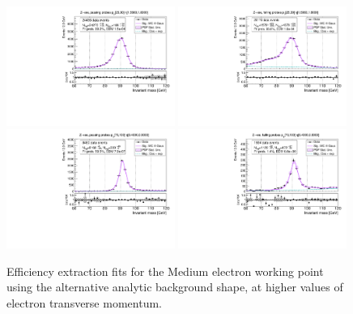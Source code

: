 {\begin{figure}
\centering
\includegraphics[width=0.49\textwidth]{figures/Zee_RecoTemplate_BkgAnalytic_pass_ptBin3_etaBin23.pdf}
\includegraphics[width=0.49\textwidth]{figures/Zee_RecoTemplate_BkgAnalytic_fail_ptBin3_etaBin23.pdf}
\includegraphics[width=0.49\textwidth]{figures/Zee_RecoTemplate_BkgAnalytic_pass_ptBin14_etaBin17.pdf}
\includegraphics[width=0.49\textwidth]{figures/Zee_RecoTemplate_BkgAnalytic_fail_ptBin14_etaBin17.pdf}
\caption{Efficiency extraction fits for the Medium electron working point using the alternative analytic background shape, at higher values of electron transverse momentum.}
\label{fig:ZeeAltBkgFits2}
\end{figure}

}
